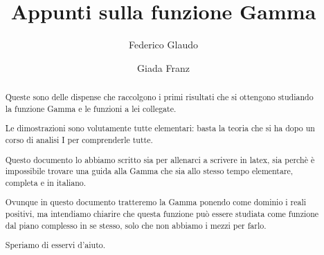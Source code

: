\documentclass[a4paper,12pt]{article}
\title{Appunti sulla funzione Gamma}
\author{Federico Glaudo \and Giada Franz}
\begin{document}
\maketitle
\clearpage


\begin{abstract}
	Queste sono delle dispense che raccolgono i primi risultati che si ottengono
	studiando la funzione Gamma e le funzioni a lei collegate.

	Le dimostrazioni sono volutamente tutte elementari: basta la teoria che si
	ha dopo un corso di analisi I per comprenderle tutte.

	Questo documento lo abbiamo scritto sia per allenarci a scrivere in latex, sia
	perchè è impossibile trovare una guida alla Gamma che sia allo stesso tempo 
	elementare, completa e in italiano.
	
	Ovunque in questo documento tratteremo la Gamma ponendo come dominio i reali positivi, ma intendiamo chiarire
	che questa funzione può essere studiata come funzione dal piano complesso in se stesso, solo che non abbiamo i mezzi per farlo.

	Speriamo di esservi d'aiuto.
\end{abstract}
\clearpage

\tableofcontents
\clearpage







\end{document}
